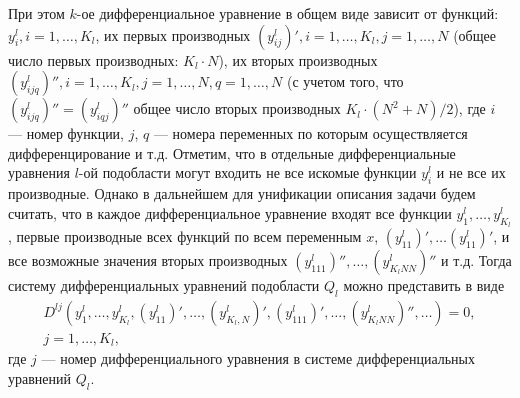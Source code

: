 \documentclass[a4paper,11pt,numreferences,mathsec,kaplist]{isuepsutf8}
\begin{document}
\begin{article}
При этом $k$-ое дифференциальное уравнение в общем виде зависит от функций:
$y^l_i, i = 1,\ldots,K_l$, их первых производных $(y^l_{ij})', i =
1,\ldots,K_l, j = 1, \ldots, N$ (общее число первых производных: $K_l \cdot
N$), их вторых производных $(y^l_{ijq})'', i = 1,\ldots,K_l, j =
1,\ldots,N, q = 1,\ldots,N$ (с учетом того, что $(y^l_{ijq})'' =
(y^l_{iqj})''$ общее число вторых производных $K_l \cdot (N^2+N) / 2$),
где $i$ --- номер функции, $j$, $q$ --- номера переменных по которым
осуществляется дифференцирование и т.д. Отметим, что в отдельные 
дифференциальные уравнения $l$-ой подобласти могут входить не все
искомые функции $y^l_i$ и не все их производные.  Однако в дальнейшем
для унификации описания задачи будем считать, что в каждое
дифференциальное уравнение входят все функции
$y^l_1,\ldots,y^l_{K_l}$, первые производные всех функций по всем
переменным $x$, $(y^l_{11})', \ldots (y^l_{11})'$, и все возможные
значения вторых производных $(y^l_{111})'', \ldots, (y^l_{K_lNN})''$ и
т.д. Тогда систему дифференциальных уравнений подобласти $Q_l$ можно
представить в виде
\begin{equation}
    \begin{array}{cc}
    D^{lj}(y^l_1,\ldots,y^l_{K_l}, (y^l_{11})',\ldots, (y^l_{K_l,N})',
        (y^l_{111})',\ldots, (y^l_{K_lNN})'',\ldots) = 0,\\ 
        j = 1, \ldots, K_l,
    \end{array}
    \label{pde}
\end{equation}
где $j$ --- номер дифференциального уравнения в 
системе дифференциальных уравнений $Q_l$.


\end{article}
\end{document}
